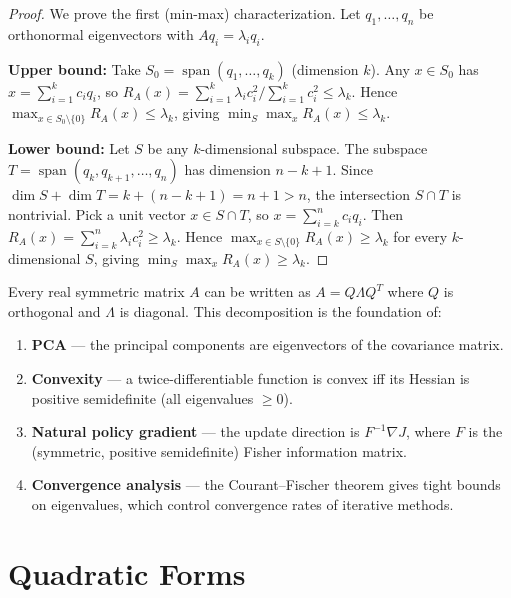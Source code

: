 \documentclass[11pt,a4paper]{article}
\theoremstyle{definition}
\theoremstyle{plain}
\theoremstyle{remark}
\DeclareMathOperator{\Span}{span}
\begin{document}
\begin{proof}
We prove the first (min-max) characterization. Let $q_1, \ldots, q_n$ be orthonormal
eigenvectors with $Aq_i = \lambda_i q_i$.

\textbf{Upper bound:} Take $S_0 = \Span(q_1, \ldots, q_k)$ (dimension $k$). Any
$x \in S_0$ has $x = \sum_{i=1}^k c_i q_i$, so
$R_A(x) = \sum_{i=1}^k \lambda_i c_i^2 / \sum_{i=1}^k c_i^2 \leq \lambda_k$.
Hence $\max_{x \in S_0 \setminus \{0\}} R_A(x) \leq \lambda_k$, giving
$\min_S \max_x R_A(x) \leq \lambda_k$.

\textbf{Lower bound:} Let $S$ be any $k$-dimensional subspace. The subspace
$T = \Span(q_k, q_{k+1}, \ldots, q_n)$ has dimension $n - k + 1$. Since
$\dim S + \dim T = k + (n - k + 1) = n + 1 > n$, the intersection $S \cap T$ is nontrivial.
Pick a unit vector $x \in S \cap T$, so $x = \sum_{i=k}^n c_i q_i$. Then
$R_A(x) = \sum_{i=k}^n \lambda_i c_i^2 \geq \lambda_k$. Hence
$\max_{x \in S \setminus \{0\}} R_A(x) \geq \lambda_k$ for every $k$-dimensional $S$,
giving $\min_S \max_x R_A(x) \geq \lambda_k$.
\end{proof}

\begin{keyresult}
Every real symmetric matrix $A$ can be written as $A = Q\Lambda Q^T$ where $Q$ is orthogonal
and $\Lambda$ is diagonal. This decomposition is the foundation of:
\begin{enumerate}[nosep]
    \item \textbf{PCA} --- the principal components are eigenvectors of the covariance matrix.
    \item \textbf{Convexity} --- a twice-differentiable function is convex iff its Hessian is
          positive semidefinite (all eigenvalues $\geq 0$).
    \item \textbf{Natural policy gradient} --- the update direction is $F^{-1}\nabla J$,
          where $F$ is the (symmetric, positive semidefinite) Fisher information matrix.
    \item \textbf{Convergence analysis} --- the Courant--Fischer theorem gives tight bounds on
          eigenvalues, which control convergence rates of iterative methods.
\end{enumerate}
\end{keyresult}

\section{Quadratic Forms}
\label{sec:quadratic}
\end{document}
